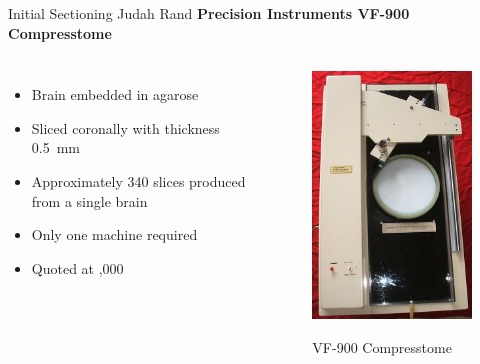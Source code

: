 \documentclass[10pt]{beamer}
\begin{document}
\begin{frame}{Initial Sectioning\hspace{0pt plus 1 filll} \small{Judah Rand}}
	\textbf{Precision Instruments VF-900 Compresstome}
	\begin{columns}[T,onlytextwidth]
		\vspace{1cm}
		\begin{itemize}[label={$\bullet$}]
			\item Brain embedded in agarose
			\item Sliced coronally with thickness \SI{0.5}{\milli\meter}
			\item Approximately 340 slices produced from a single brain
			\vspace{0.8cm}
			\item Only one machine required
			\item Quoted at ,000 \cite{VF_900_price}
		\end{itemize}
		\begin{figure}
			\centering
			\includegraphics[totalheight=5cm,width=.3\paperwidth]{VF_900}
			\caption \small VF-900 Compresstome \cite{VF_900}
		\end{figure}
	\end{columns}
\end{frame}
\end{document}
